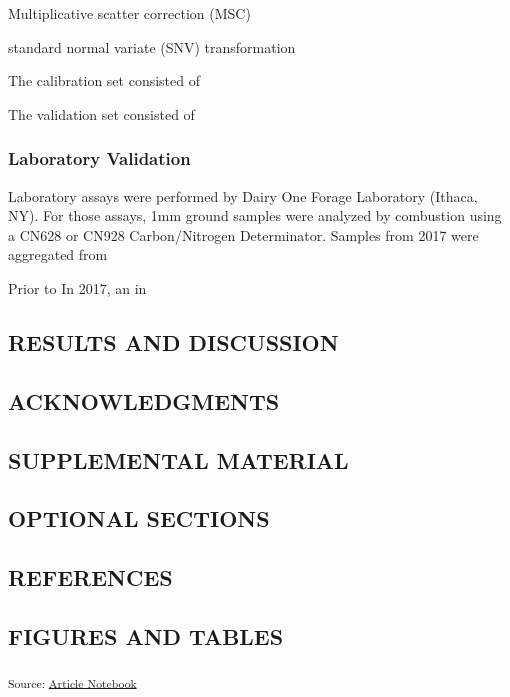 \documentclass[
]{agujournal2019}
\begin{document}
Multiplicative scatter correction (MSC)

standard normal variate (SNV) transformation

The calibration set consisted of

The validation set consisted of

\subsubsection{Laboratory Validation}\label{laboratory-validation}

Laboratory assays were performed by Dairy One Forage Laboratory (Ithaca,
NY). For those assays, 1mm ground samples were analyzed by combustion
using a CN628 or CN928 Carbon/Nitrogen Determinator. Samples from 2017
were aggregated from

Prior to In 2017, an in

\subsection{RESULTS AND DISCUSSION}\label{results-and-discussion}

\subsection{ACKNOWLEDGMENTS}\label{acknowledgments}

\subsection{SUPPLEMENTAL MATERIAL}\label{supplemental-material}

\subsection{OPTIONAL SECTIONS}\label{optional-sections}

\subsection{REFERENCES}\label{references}

\subsection{FIGURES AND TABLES}\label{figures-and-tables}

\textsubscript{Source:
\href{https://rvcrawford.github.io/glowing-system/index.qmd.html}{Article
Notebook}}
\end{document}
